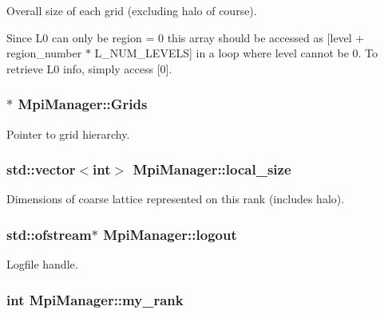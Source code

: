 Overall size of each grid (excluding halo of course). 

Since L0 can only be region = 0 this array should be accessed as \mbox{[}level + region\+\_\+number $\ast$ L\+\_\+\+N\+U\+M\+\_\+\+L\+E\+V\+E\+LS\mbox{]} in a loop where level cannot be 0. To retrieve L0 info, simply access \mbox{[}0\mbox{]}. 
\subsubsection[{\texorpdfstring{Grids}{Grids}}]{$\ast$ Mpi\+Manager\+::\+Grids}\hypertarget{class_mpi_manager_ad5ce72a2047a4cbb38f76d71c96571d8}{}\label{class_mpi_manager_ad5ce72a2047a4cbb38f76d71c96571d8}


Pointer to grid hierarchy. 

\subsubsection[{\texorpdfstring{local\+\_\+size}{local_size}}]{\setlength{\rightskip}{0pt plus 5cm}std\+::vector$<$int$>$ Mpi\+Manager\+::local\+\_\+size}\hypertarget{class_mpi_manager_ad4a918a4cd19e644ff3295b2854fc6af}{}\label{class_mpi_manager_ad4a918a4cd19e644ff3295b2854fc6af}


Dimensions of coarse lattice represented on this rank (includes halo). 

\subsubsection[{\texorpdfstring{logout}{logout}}]{\setlength{\rightskip}{0pt plus 5cm}std\+::ofstream$\ast$ Mpi\+Manager\+::logout}\hypertarget{class_mpi_manager_a9a0dd93f57d78f568048197c95311832}{}\label{class_mpi_manager_a9a0dd93f57d78f568048197c95311832}


Logfile handle. 

\subsubsection[{\texorpdfstring{my\+\_\+rank}{my_rank}}]{\setlength{\rightskip}{0pt plus 5cm}int Mpi\+Manager\+::my\+\_\+rank}\hypertarget{class_mpi_manager_a8329212abc23e5fa3e32e961b7823b5b}{}\label{class_mpi_manager_a8329212abc23e5fa3e32e961b7823b5b}


